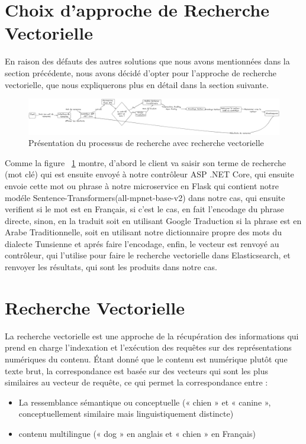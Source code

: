 \section{Choix d'approche de Recherche Vectorielle}
\noindent
En raison des défauts des autres solutions que nous avons mentionnées dans la section précédente, nous avons décidé d'opter pour l'approche de recherche vectorielle, que nous expliquerons plus en détail dans la section suivante.

\begin{figure}[H]
\centering
\includegraphics[width=1\textwidth]{logos/generalisedprocess.png}
\caption{Présentation du processus de recherche avec recherche vectorielle}
\label{fig:generalisedprocess}
\end{figure}

\newpage
\noindent
Comme la figure ~\ref{fig:generalisedprocess} montre, d'abord le client va saisir son terme de recherche (mot clé) qui est ensuite envoyé à notre contrôleur ASP .NET Core, qui ensuite envoie cette mot ou phrase à notre microservice en Flask qui contient notre modéle Sentence-Transformers(all-mpnet-base-v2) dans notre cas, qui ensuite verifient si le mot est en Français, si c'est le cas, en fait l'encodage du phrase directe, sinon, en la traduit soit en utilisant Google Traduction si la phrase est en Arabe Traditionnelle, soit en utilisant notre dictionnaire propre des mots du dialecte Tunsienne et aprés faire l'encodage, enfin, le vecteur est renvoyé au contrôleur, qui l'utilise pour faire le recherche vectorielle dans Elasticsearch, et renvoyer les résultats, qui sont les produits dans notre cas.


\section{Recherche Vectorielle}
\noindent
La recherche vectorielle est une approche de la récupération des informations qui prend en charge l’indexation et l’exécution des requêtes sur des représentations numériques du contenu. Étant donné que le contenu est numérique plutôt que texte brut, la correspondance est basée sur des vecteurs qui sont les plus similaires au vecteur de requête, ce qui permet la correspondance entre :
\begin{itemize}
    \item La ressemblance sémantique ou conceptuelle (« chien » et « canine », conceptuellement similaire mais linguistiquement distincte)
    
    \item contenu multilingue (« dog » en anglais et « chien » en Français)
\end{itemize}


